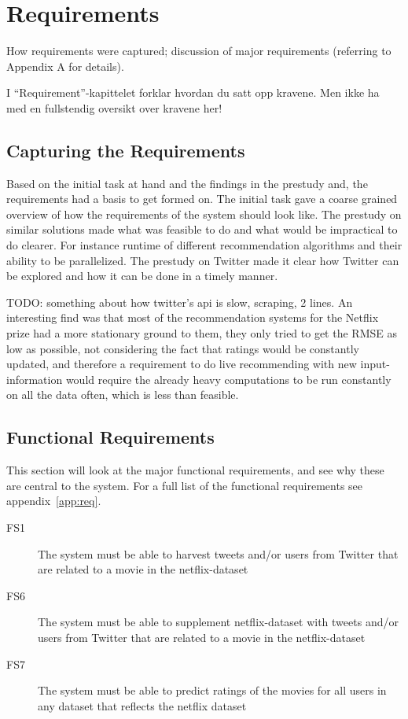 
\chapter{Requirements}

\minitoc

How requirements  were  captured;
  discussion  of  major requirements
(referring  to  Appendix  A for details).

I “Requirement”-kapittelet forklar hvordan du satt opp kravene.
Men ikke ha med en fullstendig oversikt over kravene her!


\clearpage

\section{Capturing the Requirements}
Based on the initial task at hand and the findings in the prestudy and, the requirements had a basis to get formed on. The initial task gave a coarse grained overview of how the requirements of the system should look like. The prestudy on similar solutions made what was feasible to do and what would be impractical to do clearer. For instance runtime of different recommendation algorithms and their ability to be parallelized. The prestudy on Twitter made it clear how Twitter can be explored and how it can be done in a timely manner.

TODO: something about how twitter's api is slow, scraping, 2 lines.
An interesting find was that most of the recommendation systems for the Netflix prize had a more stationary ground to them, they only tried to get the RMSE as low as possible, not considering the fact that ratings would be constantly updated, and therefore a requirement to do live recommending with new input-information would require the already heavy computations to be run constantly on all the data often, which is less than feasible.


\section{Functional Requirements}\label{section:functional-requirements}
This section will look at the major functional requirements, and see why these are central to the system. For a full list of the functional requirements see appendix~\ref{app:req}.
\begin{description}
  \item[FS1] The system must be able to harvest tweets and/or users from Twitter that are related to a movie in the netflix-dataset
  \item[FS6] The system must be able to supplement netflix-dataset with tweets and/or users from Twitter that are related to a movie in the netflix-dataset
  \item[FS7] The system must be able to predict ratings of the movies for all users in any dataset that reflects the netflix dataset
\end{description}

